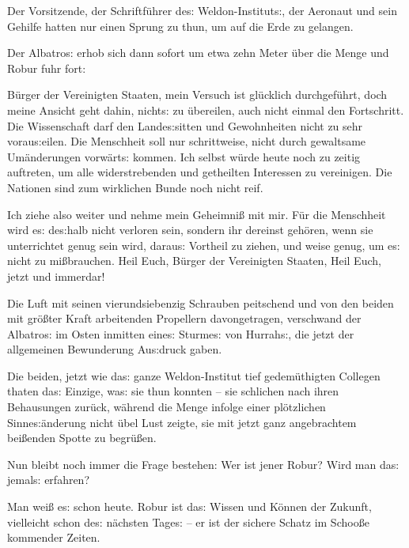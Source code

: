 \documentclass[oneside,12pt]{book}
\newcommand{\s}{s:}
\begin{document}
Der Vorsitzende, der Schriftf\"uhrer de{\s} Weldon-Institut{\s}, der
Aeronaut und sein Gehilfe hatten nur einen Sprung zu thun, um auf die
Erde zu gelangen.

Der {\glqq}Albatro{\s}{\grqq} erhob sich dann sofort um etwa zehn
Meter \"uber die Menge und Robur fuhr fort:

{\glqq}B\"urger der Vereinigten Staaten, mein Versuch ist gl\"ucklich
durchgef\"uhrt, doch meine Ansicht geht dahin, nicht{\s} zu
\"ubereilen, auch nicht einmal den Fortschritt. Die Wissenschaft darf
den Lande{\s}sitten und Gewohnheiten nicht zu sehr vorau{\s}eilen.
Die Menschheit soll nur schrittweise, nicht durch gewaltsame
Um\"anderungen vorw\"art{\s} kommen. Ich selbst w\"urde heute noch zu
zeitig auftreten, um alle widerstrebenden und getheilten Interessen
zu vereinigen. Die Nationen sind zum wirklichen Bunde noch nicht reif.

{\glqq}Ich ziehe also weiter und nehme mein Geheimni{\ss} mit mir.
F\"ur die Menschheit wird e{\s} de{\s}halb nicht verloren sein,
sondern ihr dereinst geh\"oren, wenn sie unterrichtet genug sein
wird, darau{\s} Vortheil zu ziehen, und weise genug, um e{\s} nicht
zu mi{\ss}brauchen. Heil Euch, B\"urger der Vereinigten Staaten, Heil
Euch, jetzt und immerdar!{\grqq}

Die Luft mit seinen vierundsiebenzig Schrauben peitschend und von den
beiden mit gr\"o{\ss}ter Kraft arbeitenden Propellern davongetragen,
verschwand der {\glqq}Albatro{\s}{\grqq} im Osten inmitten eine{\s}
Sturme{\s} von Hurrah{\s}, die jetzt der allgemeinen Bewunderung
Au{\s}druck gaben.

Die beiden, jetzt wie da{\s} ganze Weldon-Institut tief
gedem\"uthigten Collegen thaten da{\s} Einzige, wa{\s} sie thun
konnten -- sie schlichen nach ihren Behausungen zur\"uck, w\"ahrend
die Menge infolge einer pl\"otzlichen Sinne{\s}\"anderung nicht
\"ubel Lust zeigte, sie mit jetzt ganz angebrachtem bei{\ss}enden
Spotte zu begr\"u{\ss}en.

\begin{center}
\makebox[15em]{\hrulefill}\bigskip
\end{center}

Nun bleibt noch immer die Frage bestehen: {\glqq}Wer ist jener Robur?
Wird man da{\s} jemal{\s} erfahren?{\grqq}

Man wei{\ss} e{\s} schon heute. Robur ist da{\s} Wissen und K\"onnen
der Zukunft, vielleicht schon de{\s} n\"achsten Tage{\s} -- er ist
der sichere Schatz im Schoo{\ss}e kommender Zeiten.
\end{document}
